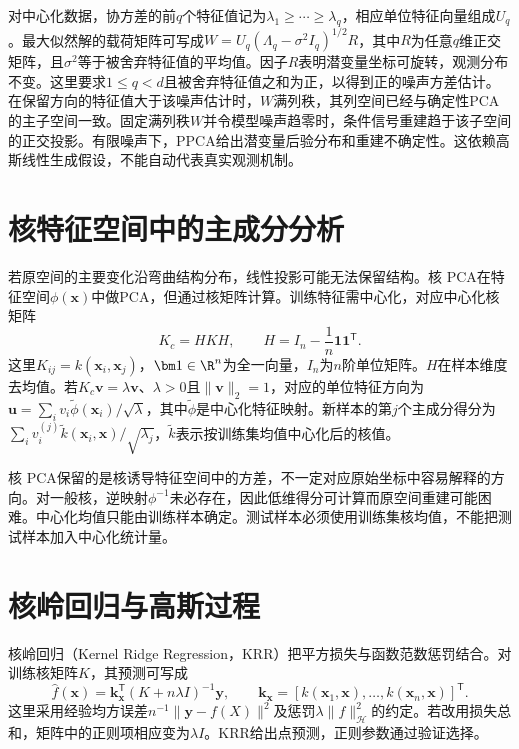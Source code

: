 对中心化数据，协方差的前$q$个特征值记为$\lambda_1\geq\cdots\geq\lambda_q$，相应单位特征向量组成$U_q$。最大似然解的载荷矩阵可写成$W=U_q(\Lambda_q-\sigma^2I_q)^{1/2}R$，其中$R$为任意$q$维正交矩阵，且$\sigma^2$等于被舍弃特征值的平均值。因子$R$表明潜变量坐标可旋转，观测分布不变。这里要求$1\le q<d$且被舍弃特征值之和为正，以得到正的噪声方差估计。在保留方向的特征值大于该噪声估计时，$W$满列秩，其列空间已经与确定性PCA的主子空间一致。固定满列秩$W$并令模型噪声趋零时，条件信号重建趋于该子空间的正交投影。有限噪声下，PPCA给出潜变量后验分布和重建不确定性。这依赖高斯线性生成假设，不能自动代表真实观测机制。

\section{核特征空间中的主成分分析}
若原空间的主要变化沿弯曲结构分布，线性投影可能无法保留结构。核 PCA在特征空间$\phi(\bm x)$中做PCA，但通过核矩阵计算。训练特征需中心化，对应中心化核矩阵
\begin{equation}
 K_c=HKH,\qquad H=I_n-\frac1n\bm1\bm1^{\mathsf T}.
\end{equation}
这里$K_{ij}=k(\bm x_i,\bm x_j)$，$\bm1\in\R^n$为全一向量，$I_n$为$n$阶单位矩阵。$H$在样本维度去均值。若$K_c\bm v=\lambda\bm v$、$\lambda>0$且$\|\bm v\|_2=1$，对应的单位特征方向为$\bm u=\sum_i v_i\tilde\phi(\bm x_i)/\sqrt{\lambda}$，其中$\tilde\phi$是中心化特征映射。新样本的第$j$个主成分得分为$\sum_i v_i^{(j)}\tilde k(\bm x_i,\bm x)/\sqrt{\lambda_j}$，$\tilde k$表示按训练集均值中心化后的核值。

核 PCA保留的是核诱导特征空间中的方差，不一定对应原始坐标中容易解释的方向。对一般核，逆映射$\phi^{-1}$未必存在，因此低维得分可计算而原空间重建可能困难。中心化均值只能由训练样本确定。测试样本必须使用训练集核均值，不能把测试样本加入中心化统计量。

\section{核岭回归与高斯过程}
核岭回归（Kernel Ridge Regression，KRR）把平方损失与函数范数惩罚结合。对训练核矩阵$K$，其预测可写成
\begin{equation}
 \hat f(\bm x)=\bm k_{\bm x}^{\mathsf T}(K+n\lambda I)^{-1}\bm y,
 \qquad \bm k_{\bm x}=[k(\bm x_1,\bm x),\ldots,k(\bm x_n,\bm x)]^{\mathsf T}.
\end{equation}
这里采用经验均方误差$n^{-1}\|\bm y-f(X)\|^2$及惩罚$\lambda\|f\|_{\mathcal H}^2$的约定。若改用损失总和，矩阵中的正则项相应变为$\lambda I$。KRR给出点预测，正则参数通过验证选择。

